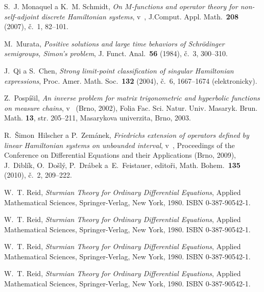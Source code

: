 \begin{thebibliography}{10}

S.~J. Monaquel a K.~M. Schmidt, \textit{On $M$-functions and operator
  theory for non-self-adjoint discrete Hamiltonian systems}, v~, J.Comput. Appl. 
  Math.~\textbf{208} (2007), \v{c}.~1, 82--101.

M.~Murata, \textit{Positive solutions and large time behaviors of
  Schrödinger semigroups, Simon's problem}, J. Funct. Anal.~\textbf{56}
  (1984), č.~3, 300--310.

J.~Qi a S.~Chen, \textit{Strong limit-point classification of singular
  Hamiltonian expressions}, Proc. Amer. Math. Soc.~\textbf{132} (2004),
  č.~6, 1667--1674 (elektronicky).

Z.~Pospíšil, \textit{An inverse problem for matrix trigonometric and
  hyperbolic functions on measure chains}, v~ (Brno, 2002), Folia Fac.
  Sci. Natur. Univ. Masaryk. Brun. Math. {\bf 13}, str. 205--211, Masarykova
  univerzita, Brno, 2003.

R.~Šimon~Hilscher a P.~Zemánek, \textit{Friedrichs extension of
  operators defined by linear Hamiltonian systems on unbounded interval}, 
  v~, Proceedings of the Conference on Differential Equations and
  their Applications (Brno, 2009), J.~Diblík, O.~Došlý, P.~Drábek 
  a~E.~Feistauer, editoři, Math. Bohem.~\textbf{135} (2010),
  č.~2, 209--222.

W.~T. Reid, \textit{Sturmian Theory for Ordinary Differential Equations}, Applied 
  Mathematical Sciences, Springer-Verlag, New York, 1980. 
  ISBN 0-387-90542-1.

W.~T. Reid, \textit{Sturmian Theory for Ordinary Differential Equations}, Applied 
  Mathematical Sciences, Springer-Verlag, New York, 1980. 
  ISBN 0-387-90542-1.

W.~T. Reid, \textit{Sturmian Theory for Ordinary Differential Equations}, Applied 
  Mathematical Sciences, Springer-Verlag, New York, 1980. 
  ISBN 0-387-90542-1.

W.~T. Reid, \textit{Sturmian Theory for Ordinary Differential Equations}, Applied 
  Mathematical Sciences, Springer-Verlag, New York, 1980. 
  ISBN 0-387-90542-1.


\end{thebibliography}

